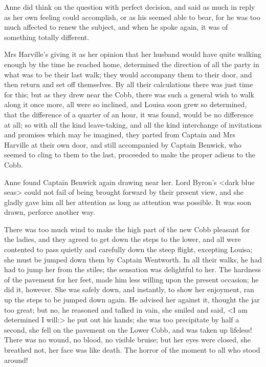 Anne did think on the question with perfect decision, and said as much in reply as her own feeling could accomplish, or as his seemed able to bear, for he was too much affected to renew the subject, and when he spoke again, it was of something totally different.

Mrs Harville's giving it as her opinion that her husband would have quite walking enough by the time he reached home, determined the direction of all the party in what was to be their last walk; they would accompany them to their door, and then return and set off themselves. By all their calculations there was just time for this; but as they drew near the Cobb, there was such a general wish to walk along it once more, all were so inclined, and Louisa soon grew so determined, that the difference of a quarter of an hour, it was found, would be no difference at all; so with all the kind leave-taking, and all the kind interchange of invitations and promises which may be imagined, they parted from Captain and Mrs Harville at their own door, and still accompanied by Captain Benwick, who seemed to cling to them to the last, proceeded to make the proper adieus to the Cobb.

Anne found Captain Benwick again drawing near her. Lord Byron's <dark blue seas> could not fail of being brought forward by their present view, and she gladly gave him all her attention as long as attention was possible. It was soon drawn, perforce another way.

There was too much wind to make the high part of the new Cobb pleasant for the ladies, and they agreed to get down the steps to the lower, and all were contented to pass quietly and carefully down the steep flight, excepting Louisa; she must be jumped down them by Captain Wentworth. In all their walks, he had had to jump her from the stiles; the sensation was delightful to her. The hardness of the pavement for her feet, made him less willing upon the present occasion; he did it, however. She was safely down, and instantly, to show her enjoyment, ran up the steps to be jumped down again. He advised her against it, thought the jar too great; but no, he reasoned and talked in vain, she smiled and said, <I am determined I will:> he put out his hands; she was too precipitate by half a second, she fell on the pavement on the Lower Cobb, and was taken up lifeless! There was no wound, no blood, no visible bruise; but her eyes were closed, she breathed not, her face was like death. The horror of the moment to all who stood around!

